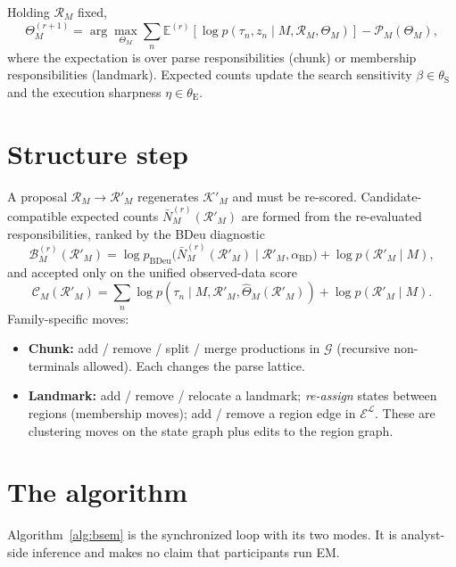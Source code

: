 \documentclass[10pt]{article}
\begin{document}
Holding $\mathcal R_M$ fixed,
\begin{equation}
\Theta_M^{(r+1)}
=\arg\max_{\Theta_M}\sum_n\mathbb E^{(r)}\!\left[\log p(\tau_n,z_n\mid M,\mathcal R_M,\Theta_M)\right]
-\mathcal P_M(\Theta_M),
\label{eq:mstep}
\end{equation}
where the expectation is over parse responsibilities (chunk) or membership responsibilities
(landmark). Expected counts update the search sensitivity $\beta\in\theta_{\mathrm S}$ and the
execution sharpness $\eta\in\theta_{\mathrm E}$.

\section{Structure step}

A proposal $\mathcal R_M\to\mathcal R'_M$ regenerates $\mathcal K'_M$ and must be re-scored.
Candidate-compatible expected counts $\bar N_M^{(r)}(\mathcal R'_M)$ are formed from the
re-evaluated responsibilities, ranked by the BDeu diagnostic
\begin{equation}
\mathcal B_M^{(r)}(\mathcal R'_M)
=\log p_{\mathrm{BDeu}}\!\bigl(\bar N_M^{(r)}(\mathcal R'_M)\mid\mathcal R'_M,\alpha_{\mathrm{BD}}\bigr)
+\log p(\mathcal R'_M\mid M),
\label{eq:bdeu}
\end{equation}
and accepted only on the unified observed-data score
\begin{equation}
\mathcal C_M(\mathcal R'_M)
=\sum_n\log p(\tau_n\mid M,\mathcal R'_M,\widehat\Theta_M(\mathcal R'_M))
+\log p(\mathcal R'_M\mid M).
\label{eq:accept}
\end{equation}
Family-specific moves:
\begin{itemize}
\item \textbf{Chunk:} add / remove / split / merge productions in $\mathcal G$ (recursive
non-terminals allowed). Each changes the parse lattice.
\item \textbf{Landmark:} add / remove / relocate a landmark; \emph{re-assign} states between
regions (membership moves); add / remove a region edge in $\mathcal E^{\mathcal L}$. These are
clustering moves on the state graph plus edits to the region graph.
\end{itemize}

\section{The algorithm}

Algorithm~\ref{alg:bsem} is the synchronized loop with its two modes. It is analyst-side
inference and makes no claim that participants run EM.
\end{document}
